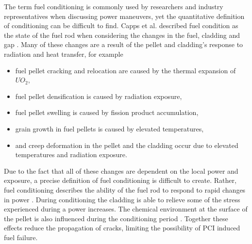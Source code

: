 \documentclass[edeposit,fullpage,11pt]{uiucthesis2009}
\begin{document}
The term fuel conditioning is commonly used by researchers and industry representatives when discussing power maneuvers, yet the quantitative definition of conditioning can be difficult to find.
Capps et al. described fuel condition as the state of the fuel rod when considering the changes in the fuel, cladding and gap \cite{capps_evaluation_2016}.
Many of these changes are a result of the pellet and cladding's response to radiation and heat transfer, for example
\begin{itemize}
\item fuel pellet cracking and relocation are caused by the thermal expansion of $UO_2$,
\item fuel pellet densification is caused by radiation exposure,
\item fuel pellet swelling is caused by fission product accumulation,
\item grain growth in fuel pellets is caused by elevated temperatures,
\item and creep deformation in the pellet and the cladding occur due to elevated temperatures and radiation exposure.
\end{itemize}
Due to the fact that all of these changes are dependent on the local power and exposure, a precise definition of fuel conditioning is difficult to create.
Rather, fuel conditioning describes the ability of the fuel rod to respond to rapid changes in power \cite{capps_evaluation_2016}.
During conditioning the cladding is able to relieve some of the stress experienced during a power increases.
The chemical environment at the surface of the pellet is also influenced during the conditioning period \cite{cox_pellet-clad_1990}.
Together these effects reduce the propagation of cracks, limiting the possibility of \gls{PCI} induced fuel failure.
\end{document}

